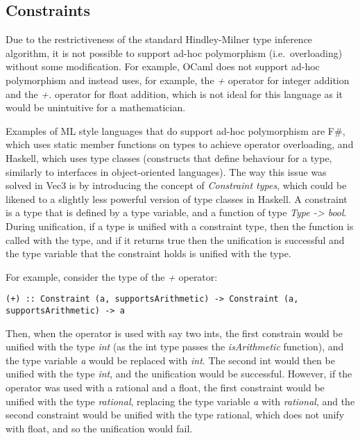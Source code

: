 \subsection{Constraints}\label{subsec:constraints}

Due to the restrictiveness of the standard Hindley-Milner type inference algorithm, it is not possible to support ad-hoc
polymorphism (i.e.\ overloading) without some modification.
For example, OCaml\citep{ocamlDocs} does not support ad-hoc polymorphism and instead uses, for example, the \textit{+}
operator for integer addition and the \textit{+.} operator for float addition, which is not ideal for this language 
as it would be unintuitive for a mathematician.

Examples of ML style languages that do support ad-hoc polymorphism are F\#, which uses static member functions on 
types to achieve operator overloading\citep{fsharpdocs}, and Haskell, which uses type classes\citep{haskellDocs} (constructs that define behaviour for a type, similarly to interfaces in object-oriented languages).
The way this issue was solved in Vec3 is by introducing the concept of \textit{Constraint types}, which could be 
likened to a slightly less powerful version of type classes in Haskell.
A constraint is a type that is defined by a type variable, and a function of type \textit{Type -> bool}.
During unification, if a type is unified with a constraint type, then the function is called with the type, and if it
returns true then the unification is successful and the type variable that the constraint holds is unified with the
type.

For example, consider the type of the \textit{+} operator:

\begin{verbatim}
(+) :: Constraint (a, supportsArithmetic) -> Constraint (a, supportsArithmetic) -> a
\end{verbatim}

Then, when the operator is used with say two ints, the first constrain would be unified with the type 
\textit{int} (as the int type passes the \textit{isArithmetic} function), and the type variable \textit{a} would be 
replaced with \textit{int}.
The second int would then be unified with the type \textit{int}, and the unification would be successful.
However, if the operator was used with a rational and a float, the first constraint would be unified with the type
\textit{rational}, replacing the type variable \textit{a} with \textit{rational}, and the second constraint would be 
unified 
with the type rational, which does not unify with float, and so the unification would fail.

